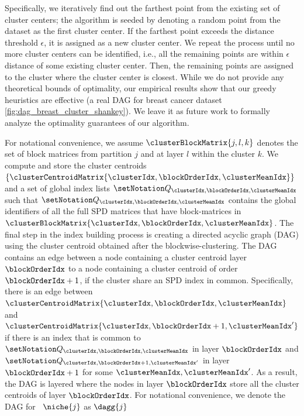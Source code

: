 \documentclass[pdflatex,sn-mathphys-num]{sn-jnl}%
\theoremstyle{thmstyleone}%
\theoremstyle{thmstyletwo}%
\theoremstyle{thmstylethree}%
\begin{document}
Specifically, we iteratively find out the farthest point from the existing set of cluster centers; the algorithm is seeded by denoting a random point from the dataset as the first cluster center. If the farthest point exceeds the distance threshold $\epsilon$, it is assigned as a new cluster center. We repeat the process until no more cluster centers can be identified, i.e., all the remaining points are within $\epsilon$ distance of some existing cluster center. Then, the remaining points are assigned to the cluster where the cluster center is closest. 
While we do not provide any theoretical bounds of optimality, our empirical results show that our greedy heuristics are effective (a real DAG for breast cancer dataset \ref{fig:dag_breast_cluster_shankey}). We leave it as future work to formally analyze the optimality guarantees of our algorithm. 










For notational convenience, we assume $\clusterBlockMatrix{j,l,k}$ denotes the set of block matrices from partition $j$ and at layer $l$ within the cluster $k$. We compute and store the cluster centroids $\{ \clusterCentroidMatrix{\clusterIdx, \blockOrderIdx, \clusterMeanIdx} \}$ and a set of global index lists ${\spdMatrixIDList{\clusterIdx, \blockOrderIdx, \clusterMeanIdx}}$ such that $\spdMatrixIDList{\clusterIdx, \blockOrderIdx, \clusterMeanIdx}$ contains the global identifiers of all the full SPD matrices that have block-matrices in $\clusterBlockMatrix{\clusterIdx, \blockOrderIdx, \clusterMeanIdx}$. 
The final step in the index building process is creating a directed acyclic graph (DAG) using the cluster centroid obtained after the blockwise-clustering. The DAG contains an  edge between a node containing a cluster centroid layer $\blockOrderIdx$ to a node containing a cluster centroid of order  $\blockOrderIdx + 1$, if the cluster share an SPD index in common. Specifically, there is an edge between $\clusterCentroidMatrix{\clusterIdx, \blockOrderIdx, \clusterMeanIdx}$ and $\clusterCentroidMatrix{\clusterIdx, \blockOrderIdx+1, \clusterMeanIdx'}$ if there is an index that is common to
 $\spdMatrixIDList{\clusterIdx, \blockOrderIdx, \clusterMeanIdx}$ in layer $\blockOrderIdx$ and $\spdMatrixIDList{\clusterIdx, \blockOrderIdx+1, \clusterMeanIdx'}$ in layer $\blockOrderIdx + 1$ for some $\clusterMeanIdx, \clusterMeanIdx'$. As a result, the DAG is layered where the nodes in layer $\blockOrderIdx$ store all the cluster centroids of layer $\blockOrderIdx$. For notational convenience, we denote the DAG for \spdniche~$\niche{j}$ as $\dagg{j}$
\end{document}

